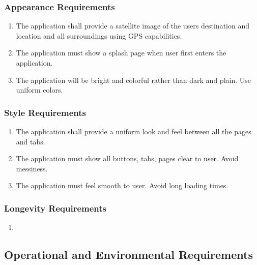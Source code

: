 \documentclass[english]{article}
\begin{document}
\subsubsection{Appearance Requirements}
\label{ssub:appearance_requirements}
\begin{enumerate}[{LF}1. ]
	\item 
	The application shall provide a satellite image of the users destination and location and all surroundings using GPS capabilities.
	\item
	The application must show a splash page when user first enters the application.
	\item
	The application will be bright and colorful rather than dark and plain. Use uniform colors.
\end{enumerate}

\subsubsection{Style Requirements}
\label{ssub:style_requirements}
\begin{enumerate}[{LF}1. ]
	\item 
	The application shall provide a uniform look and feel between all the pages and tabs.
	\item
	The application must show all buttons, tabs, pages clear to user. Avoid messiness.
	\item
	The application must feel smooth to user. Avoid long loading times. 
\end{enumerate}


\subsubsection{Longevity Requirements}
\label{ssub:longevity_requirements}
\begin{enumerate}[{PR}1. ]
	\item 
\end{enumerate}


\subsection{Operational and Environmental Requirements}
\label{sub:operational_and_environmental_requirements}
\end{document}
